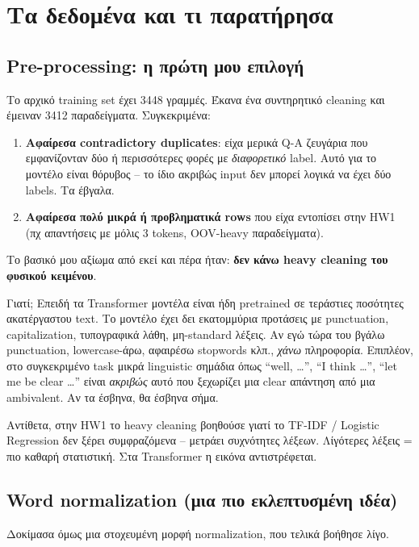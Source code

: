 \documentclass[12pt]{fphw}
\begin{document}
\section{Τα δεδομένα και τι παρατήρησα}

\subsection{Pre-processing: η πρώτη μου επιλογή}

Το αρχικό training set έχει 3448 γραμμές. Έκανα ένα συντηρητικό cleaning και έμειναν 3412 παραδείγματα. Συγκεκριμένα:

\begin{enumerate}
    \item \textbf{Αφαίρεσα contradictory duplicates}: είχα μερικά Q-A ζευγάρια που εμφανίζονταν δύο ή περισσότερες φορές με \emph{διαφορετικό} label. Αυτό για το μοντέλο είναι θόρυβος -- το ίδιο ακριβώς input δεν μπορεί λογικά να έχει δύο labels. Τα έβγαλα.
    \item \textbf{Αφαίρεσα πολύ μικρά ή προβληματικά rows} που είχα εντοπίσει στην HW1 (πχ απαντήσεις με μόλις 3 tokens, OOV-heavy παραδείγματα).
\end{enumerate}

Το βασικό μου αξίωμα από εκεί και πέρα ήταν: \textbf{δεν κάνω heavy cleaning του φυσικού κειμένου}.

Γιατί; Επειδή τα Transformer μοντέλα είναι ήδη pretrained σε τεράστιες ποσότητες ακατέργαστου text. Το μοντέλο έχει δει εκατομμύρια προτάσεις με punctuation, capitalization, τυπογραφικά λάθη, μη-standard λέξεις. Αν εγώ τώρα του βγάλω punctuation, lowercase-άρω, αφαιρέσω stopwords κλπ., \emph{χάνω} πληροφορία. Επιπλέον, στο συγκεκριμένο task μικρά linguistic σημάδια όπως ``well, \dots'', ``I think \dots'', ``let me be clear \dots'' είναι \emph{ακριβώς} αυτό που ξεχωρίζει μια clear απάντηση από μια ambivalent. Αν τα έσβηνα, θα έσβηνα σήμα.

Αντίθετα, στην HW1 το heavy cleaning βοηθούσε γιατί το TF-IDF / Logistic Regression δεν ξέρει συμφραζόμενα -- μετράει συχνότητες λέξεων. Λίγότερες λέξεις = πιο καθαρή στατιστική. Στα Transformer η εικόνα αντιστρέφεται.

\subsection{Word normalization (μια πιο εκλεπτυσμένη ιδέα)}

Δοκίμασα όμως μια στοχευμένη μορφή normalization, που τελικά βοήθησε λίγο.
\end{document}
